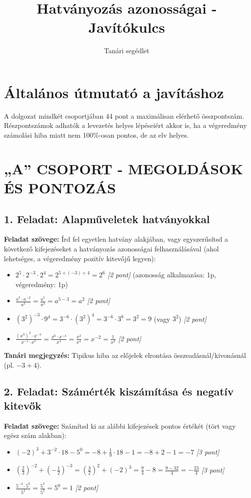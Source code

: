 \documentclass[11pt,a4paper]{article}
\title{Hatványozás azonosságai - Javítókulcs}
\author{Tanári segédlet}
\date{}
\begin{document}
\maketitle

\section*{Általános útmutató a javításhoz}
A dolgozat mindkét csoportjában 44 pont a maximálisan elérhető összpontszám. Részpontszámok adhatók a levezetés helyes lépéseiért akkor is, ha a végeredmény számolási hiba miatt nem 100\%-osan pontos, de az elv helyes.

\section*{„A” CSOPORT - MEGOLDÁSOK ÉS PONTOZÁS}

\subsection*{1. Feladat: Alapműveletek hatványokkal}
\textbf{Feladat szövege:} Írd fel egyetlen hatvány alakjában, vagy egyszerűsítsd a következő kifejezéseket a hatványozás azonosságai felhasználásával (ahol lehetséges, a végeredmény pozitív kitevőjű legyen):
\begin{itemize}
    \item[a)] $2^5 \cdot 2^{-3} \cdot 2^4 = 2^{5+(-3)+4} = 2^6$ \hfill \textit{[2 pont]} (azonosság alkalmazása: 1p, végeredmény: 1p)
    \item[b)] $\frac{a^7 \cdot a^{-2}}{a^3} = \frac{a^5}{a^3} = a^{5-3} = a^2$ \hfill \textit{[2 pont]}
    \item[c)] $(3^2)^{-3} \cdot 9^4 = 3^{-6} \cdot (3^2)^4 = 3^{-6} \cdot 3^8 = 3^2 = 9$ (vagy $3^2$) \hfill \textit{[2 pont]}
    \item[d)] $\frac{(x^3)^2 \cdot x^{-4}}{x^{-1} \cdot x^5} = \frac{x^6 \cdot x^{-4}}{x^4} = \frac{x^2}{x^4} = x^{-2} = \frac{1}{x^2}$ \hfill \textit{[2 pont]}
\end{itemize}
\textbf{Tanári megjegyzés:} Tipikus hiba az előjelek elrontása összeadásnál/kivonásnál (pl. $-3+4$).

\subsection*{2. Feladat: Számérték kiszámítása és negatív kitevők}
\textbf{Feladat szövege:} Számítsd ki az alábbi kifejezések pontos értékét (tört vagy egész szám alakban):
\begin{itemize}
    \item[a)] $(-2)^3 + 3^{-2} \cdot 18 - 5^0 = -8 + \frac{1}{9} \cdot 18 - 1 = -8 + 2 - 1 = -7$ \hfill \textit{[3 pont]}
    \item[b)] $\left(\frac{2}{3}\right)^{-2} + \left(-\frac{1}{2}\right)^{-3} = \left(\frac{3}{2}\right)^2 + (-2)^3 = \frac{9}{4} - 8 = \frac{9-32}{4} = -\frac{23}{4}$ \hfill \textit{[3 pont]}
    \item[c)] $\frac{5^{-4} \cdot 5^6}{5^2} = \frac{5^2}{5^2} = 5^0 = 1$ \hfill \textit{[2 pont]}
\end{itemize}
\end{document}
